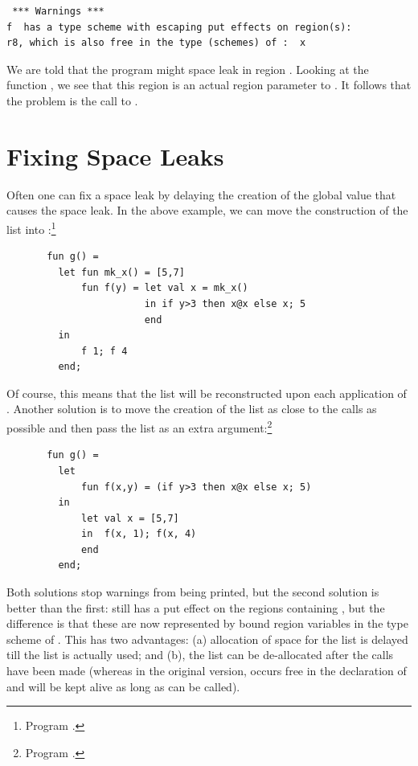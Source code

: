 \documentclass[12pt]{book}
\begin{document}
\begin{verbatim}
 *** Warnings ***
f  has a type scheme with escaping put effects on region(s): 
r8, which is also free in the type (schemes) of :  x
\end{verbatim}
We are told that the program might space
leak in region . Looking at the 
function , we see that this region is an actual
region parameter to . It follows that the problem is the
call to .

\section{Fixing Space Leaks}
Often one can fix a space leak by delaying the creation of the
global value that causes the space leak. In the above example,
we can move the construction of the list into :\footnote{Program .}
\begin{verbatim}
       fun g() = 
         let fun mk_x() = [5,7]
             fun f(y) = let val x = mk_x()
                        in if y>3 then x@x else x; 5 
                        end
         in 
             f 1; f 4
         end;
\end{verbatim}
Of course, this means that the list will be reconstructed upon each application
of . Another solution is to move the creation of the list as close to 
the calls as possible and then pass the list as an extra argument:\footnote{Program .}
\begin{verbatim}
       fun g() = 
         let 
             fun f(x,y) = (if y>3 then x@x else x; 5)
         in 
             let val x = [5,7]
             in  f(x, 1); f(x, 4)
             end
         end;
\end{verbatim}
Both solutions stop warnings from being printed, 
but the second solution is better than the first:  still has a
put effect on the regions containing , but the difference
is that these are now represented by bound region variables in the type scheme of
. This has two advantages: (a) allocation of space for the list is
delayed till the list is actually used; and (b), the list can be de-allocated
after the calls have been made (whereas in the original version,  occurs
free in the declaration of  and will be kept alive as long as  can be called).
\end{document}
